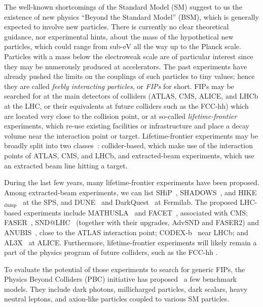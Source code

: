 \documentclass[
    aps,prd,
    twocolumn,
    nofootinbib,
    superscriptaddress,
]{revtex4}
\begin{document}
The well-known shortcomings of the Standard Model (SM) suggest to us the existence of new physics ``Beyond the Standard Model'' (BSM), which is generally expected to involve new particles. There is currently no clear theoretical guidance, nor experimental hints, about the mass of the hypothetical new particles, which could range from sub-$\text{eV}$ all the way up to the Planck scale. Particles with a mass below the electroweak scale are of particular interest since they may be numerously produced at accelerators. The past experiments have already pushed the limits on the couplings of such particles to tiny values; hence they are called \textit{feebly interacting particles}, or \textit{FIPs} for short. FIPs may be searched for at the main detectors of colliders (ATLAS, CMS, ALICE, and LHCb at the LHC, or their equivalents at future colliders such as the FCC-hh) which are located very close to the collision point, or at so-called \textit{lifetime-frontier} experiments, which re-use existing facilities or infrastructure and place a decay volume near the interaction point or target. Lifetime-frontier experiments may be broadly split into two classes~\cite{Beacham:2019nyx}: collider-based, which make use of the interaction points of ATLAS, CMS, and LHCb, and extracted-beam experiments, which use an extracted beam line hitting a target. 

During the last few years, many lifetime-frontier experiments have been proposed. Among extracted-beam experiments, we can list SHiP~\cite{Alekhin:2015byh,Aberle:2839677}, SHADOWS~\cite{Alviggi:2839484}, and HIKE$_{\text{dump}}$~\cite{CortinaGil:2839661} at the SPS, and DUNE~\cite{DUNE:2020ypp,DUNE:2020fgq} and DarkQuest~\cite{Batell:2020vqn} at Fermilab. The proposed LHC-based experiments include MATHUSLA~\cite{MATHUSLA:2019qpy} and FACET~\cite{Cerci:2021nlb}, associated with CMS; FASER~\cite{FASER:2018bac}, SND@LHC~\cite{SHiP:2020sos} (together with their upgrades, AdvSND and FASER2) and ANUBIS~\cite{Bauer:2019vqk}, close to the ATLAS interaction point; CODEX-b~\cite{Aielli:2019ivi} near LHCb; and AL3X~\cite{Dercks:2018wum} at ALICE. Furthermore, lifetime-frontier experiments will likely remain a part of the physics program of future colliders, such as the {FCC-hh} \cite{Boyarsky:2022epg}.

To evaluate the potential of those experiments to search for generic FIPs, the Physics Beyond Colliders (PBC) initiative has proposed~\cite{Beacham:2019nyx} a few benchmark models. They include dark photons, millicharged particles, dark scalars, heavy neutral leptons, and axion-like particles coupled to various SM particles.
\end{document}
